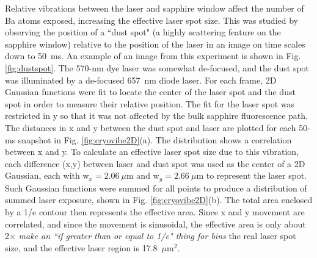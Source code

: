 Relative vibrations between the laser and sapphire window affect the number of Ba atoms exposed, increasing the effective laser spot size.  This was studied by observing the position of a ``dust spot" (a highly scattering feature on the sapphire window) relative to the position of the laser in an image on time scales down to 50~ms.  An example of an image from this experiment is shown in Fig. \ref{fig:dustspot}.  The 570-nm dye laser was somewhat de-focused, and the dust spot was illuminated by a de-focused 657~nm diode laser. For each frame, 2D Gaussian functions were fit to locate the center of the laser spot and the dust spot in order to measure their relative position.  The fit for the laser spot was restricted in y so that it was not affected by the bulk sapphire fluorescence path.  The distances in x and y between the dust spot and laser are plotted for each 50-ms snapshot in Fig. \ref{fig:cryovibe2D}(a).  The distribution shows a correlation between x and y.  To calculate an effective laser spot size due to this vibration, each difference (x,y) between laser and dust spot was used as the center of a 2D Gaussian, each with w$_{x} = 2.06~\mu$m and w$_{y} = 2.66~\mu$m to represent the laser spot.  Such Gaussian functions were summed for all points to produce a distribution of summed laser exposure, shown in Fig. \ref{fig:cryovibe2D}(b).  The total area enclosed by a 1/e contour then represents the effective area.  Since x and y movement are correlated, and since the movement is sinusoidal, the effective area is only about {\color{red}2$\times$} \emph{\color{gray}make an ``if greater than or equal to 1/e" thing for bins} the real laser spot size, and the effective laser region is {\color{red}17.8~$\mu$m$^{2}$}.


